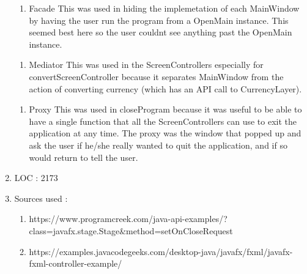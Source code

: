 \documentclass[12pt]{article}
\begin{document}
\begin{enumerate}
	\begin{enumerate}
		\item Facade
		\subitem This was used in hiding the implemetation of each MainWindow by having the user run the program from a OpenMain instance. This seemed best here so the user couldnt see anything past the OpenMain instance.
	\end{enumerate}

	\begin{enumerate}
		\item Mediator
		\subitem This was used in the ScreenControllers especially for convertScreenController because it separates MainWindow from the action of converting currency (which has an API call to CurrencyLayer).
	\end{enumerate}
	
	\begin{enumerate}
		\item Proxy
		\subitem This was used in closeProgram because it was useful to be able to have a single function that all the ScreenControllers can use to exit the application at any time. The proxy was the window that popped up and ask the user if he/she really wanted to quit the application, and if so would return to tell the user.
	\end{enumerate}

\item   LOC : 2173

\item   Sources used : 

	\begin{enumerate}
	\item https://www.programcreek.com/java-api-examples/?class=javafx.stage.Stage\&method=setOnCloseRequest
	\item https://examples.javacodegeeks.com/desktop-java/javafx/fxml/javafx-fxml-controller-example/

	\end{enumerate}

\end{enumerate}
\newpage
\end{document}
